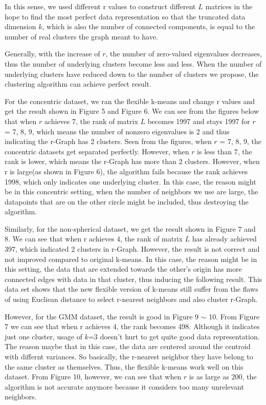 \documentclass[]{homework}
\begin{document}
In this sense, we used different r values to construct different $L$ matrices in the hope to find the most perfect data representation so that the truncated data dimension $k$, which is also the number of connected components, is equal to the number of real clusters the graph meant to have.

Generally, with the increase of $r$, the number of zero-valued eigenvalues decreases, thus the number of underlying clusters become less and less. When the number of underlying clusters have reduced down to the number of clusters we propose, the clustering algorithm can achieve perfect result.

For the concentric dataset, we ran the flexible k-means and change r values and get the result shown in Figure 5 and Figure 6. We can see from the figures below that when $r$ achieves 7, the rank of matrix $L$ becomes 1997 and stays 1997 for $r$ = 7, 8, 9, which means the number of nonzero eigenvalues is 2 and thus indicating the r-Graph has 2 clusters. Seen from the figures, when $r$ = 7, 8, 9, the concentric datasets get separated perfectly. However, when $r$ is less than 7, the rank is lower, which means the r-Graph has more than 2 clusters. However, when r is large(as shown in Figure 6), the algorithm fails because the rank achieves 1998, which only indicates one underlying cluster. In this case, the reason might be in this concentric setting, when the number of neighbors we use are large, the datapoints that are on the other circle might be included, thus destroying the algorithm. 

Similarly, for the non-spherical dataset, we get the result shown in Figure 7 and 8. We can see that when r achieves 4, the rank of matrix $L$ has already achieved 397, which indicated 2 clusters in r-Graph. However, the result is not correct and not improved compared to original k-means. In this case, the reason might be in this setting, the data that are extended towards the other's origin has more connected edges with data in that cluster, thus inducing the following result. This data set shows that the new flexible version of k-means still suffer from the flaws of using Eucliean distance to select r-nearest neighbors and also cluster r-Graph.

However, for the GMM dataset, the result is good in Figure 9 $\sim$ 10. From Figure 7 we can see that when r achieves 4, the rank becomes 498. Although it indicates just one cluster, usage of $k$=3 doesn't hurt to get quite good data representation. The reason maybe that in this case, the data are centered around the centroid with differnt variances. So basically, the r-nearest neighbor they have belong to the same cluster as themselves. Thus, the flexible k-means work well on this dataset. From Figure 10, however, we can see that when $r$ is as large as 200, the algorithm is not accurate anymore because it considers too many unrelevant neighbors.
\end{document}
